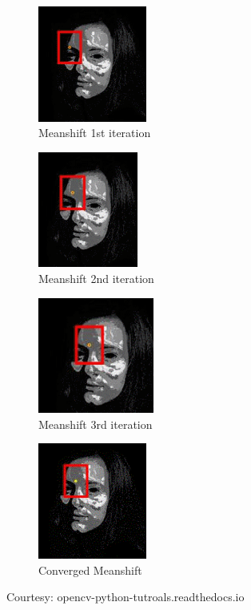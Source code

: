\documentclass[11pt,a4paper]{article}
\begin{document}
				\begin{figure}[h!]
					\begin{subfigure}{0.5\textwidth}
						\includegraphics[width=0.9\linewidth, height=3.8cm]{../Images/msi.png} 
						\caption{Meanshift 1st iteration}
					\end{subfigure}
					\begin{subfigure}{0.5\textwidth}
						\includegraphics[width=0.9\linewidth, height=3.8cm]{../Images/ms2nd.png}
						\caption{Meanshift 2nd iteration}
					\end{subfigure}
					\begin{subfigure}{0.5\textwidth}
						\includegraphics[width=0.9\linewidth, height=3.8cm]{../Images/ms3rd.png}
						\caption{Meanshift 3rd iteration}
					\end{subfigure}
					\begin{subfigure}{0.5\textwidth}
						\includegraphics[width=0.9\linewidth, height=3.8cm]{../Images/msconverged.png} 
						\caption{Converged  Meanshift}
					\end{subfigure}
					\caption{Courtesy: opencv-python-tutroals.readthedocs.io}
				\end{figure}
				
\end{document}
